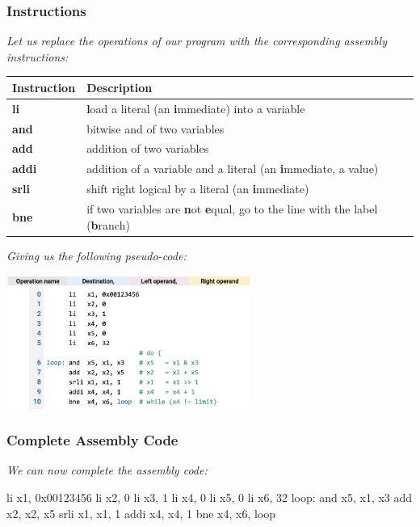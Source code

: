 \documentclass[12pt,openany]{book}
\begin{document}
\subsubsection{Instructions}
\textit{Let us replace the operations of our program with the corresponding assembly instructions:}
\begin{center}
\begin{tabular}{ll}
	\hline
	\textbf{Instruction} & \textbf{Description} \\
	\hline
	\textbf{li} & \textbf{l}oad a literal (an \textbf{i}mmediate) into a variable \\
	\textbf{and} & bitwise and of two variables \\
	\textbf{add} & addition of two variables \\
	\textbf{addi} & addition of a variable and a literal (an \textbf{i}mmediate, a value) \\
	\textbf{srli} & shift right logical by a literal (an \textbf{i}mmediate) \\
	\textbf{bne} & if two variables are \textbf{n}ot \textbf{e}qual, go to the line with the label (\textbf{b}ranch) \\
	\hline
	\end{tabular}
\end{center}
\vspace*{10px}
\textit{Giving us the following pseudo-code:}
\begin{center}
	\includegraphics[width=0.6\textwidth]{circuits/19.3.2_3.png}
\end{center}

\subsubsection{Complete Assembly Code}
\textit{We can now complete the assembly code:}
\begin{assembly}
		li x1, 0x00123456
		li x2, 0
		li x3, 1
		li x4, 0
		li x5, 0
		li x6, 32
loop:	and x5, x1, x3
		add x2, x2, x5
		srli x1, x1, 1
		addi x4, x4, 1
		bne x4, x6, loop
\end{assembly}
\end{document}

